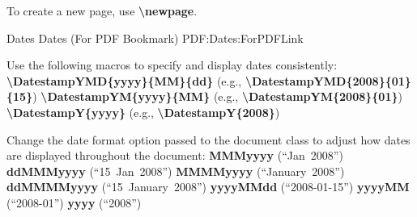 \documentclass[letterpaper,MMMyyyy,nonstopmode]{simpleresumecv}
\newcommand{\Code}[1]{\mbox{\textbf{#1}}}
\newcommand{\CodeCommand}[1]{\mbox{\textbf{\textbackslash{#1}}}}
\begin{document}
\begin{Body}
\Gap
\BulletItem
To create a new page, use \CodeCommand{newpage}.

\BigGap
\SubSection
{Dates}
{Dates (For PDF Bookmark)}
{PDF:Dates:ForPDFLink}

\Gap
\BulletItem
Use the following macros to specify and display dates consistently:
\SubBulletItem
\CodeCommand{DatestampYMD\{yyyy\}\{MM\}\{dd\}}
(e.g., \CodeCommand{DatestampYMD\{2008\}\{01\}\{15\}})
\SubBulletItem
\CodeCommand{DatestampYM\{yyyy\}\{MM\}}
(e.g., \CodeCommand{DatestampYM\{2008\}\{01\}})
\SubBulletItem
\CodeCommand{DatestampY\{yyyy\}}
(e.g., \CodeCommand{DatestampY\{2008\}})

\Gap
\BulletItem
Change the date format option passed to the document class to adjust how dates are displayed throughout the document:
\SubBulletItem
\Code{MMMyyyy} (``Jan~2008'')
\SubBulletItem
\Code{ddMMMyyyy} (``15~Jan~2008'')
\SubBulletItem
\Code{MMMMyyyy} (``January~2008'')
\SubBulletItem
\Code{ddMMMMyyyy} (``15~January~2008'')
\SubBulletItem
\Code{yyyyMMdd} (``2008-01-15'')
\SubBulletItem
\Code{yyyyMM} (``2008-01'')
\SubBulletItem
\Code{yyyy} (``2008'')

\endgroup

\fi

\end{Body}
\end{document}
